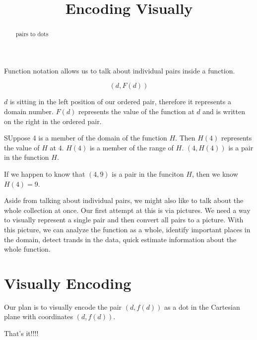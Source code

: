 \documentclass{ximera}
\title{Encoding Visually}
\begin{document}
\begin{abstract}
pairs to dots
\end{abstract}
\maketitle


Function notation allows us to talk about individual pairs inside a function.


\[
(d, F(d))
\]

$d$ is sitting in the left position of our ordered pair, therefore it represents a domain number. $F(d)$ represents the value of the function at $d$ and is written on the right in the ordered pair.


\begin{example}
SUppose 4 is a member of the domain of the function $H$. Then $H(4)$ represents the value of $H$ at $4$. $H(4)$ is a member of the range of $H$. $(4, H(4))$ is a pair in the function $H$.

If we happen to know that $(4, 9)$ is a pair in the funciton $H$, then we know $H(4) = 9$.

\end{example}


Aside from talking about individual pairs, we might also like to talk about the whole collection at once.  Our first attempt at this is via pictures. We need a way to visually represent a single pair and then convert all pairs to a picture.  With this picture, we can analyze the function as a whole, identify important places in the domain, detect trands in the data, quick estimate information about the whole function.


\section{Visually Encoding}

Our plan is to visually encode the pair $(d,f(d))$ as a dot in the Cartesian plane with coordinates $(d,f(d))$.

\begin{center}
That's it!!!!
\end{center}
\end{document}
